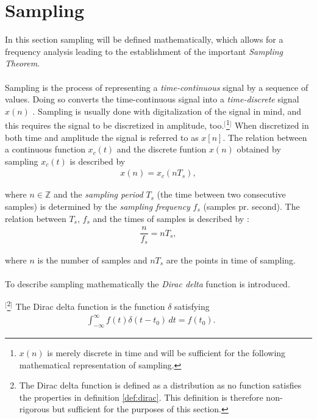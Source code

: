\section{Sampling} \label{sec:sampling}
In this section sampling will be defined mathematically, which allows for a frequency analysis leading to the establishment of the important \textit{Sampling Theorem}.
\\ \\
Sampling is the process of representing a \textit{time-continuous} signal by a sequence of values. Doing so converts the time-continuous signal into a \textit{time-discrete} signal $x(n)$ \cite{pelgrom}. Sampling is usually done with digitalization of the signal in mind, and this requires the signal to be discretized in amplitude, too.$^[$\footnote{$x(n)$ is merely discrete in time and will be sufficient for the following mathematical representation of sampling.}$^]$ When discretized in both time and amplitude the signal is referred to as $x[n]$. The relation between a continuous function $x_c(t)$ and the discrete funtion $x(n)$ obtained by sampling $x_c(t)$ is described by
\begin{align} \label{eq:sampling_principle}
x(n)=x_c(nT_s),
\end{align}

where $n \in \mathbb{Z}$ and the \textit{sampling period} $T_s$ (the time between two consecutive samples) is determined by the \textit{sampling frequency} $f_s$ (samples pr. second). The relation between $T_s$, $f_s$ and the times of samples is described by \cite{pelgrom}:
\begin{align} \label{eq:sample_freq}
\dfrac{n}{f_s} = nT_s,
\end{align}

where $n$ is the number of samples and $nT_s$ are the points in time of sampling.
\\ \\
To describe sampling mathematically the \textit{Dirac delta} function is introduced.

\begin{definition}$^[$\footnote{The Dirac delta function is defined as a distribution as no function satisfies the properties in definition \ref{def:dirac}. This definition is therefore non-rigorous but sufficient for the purposes of this section.}$^]$ \label{def:dirac}
The Dirac delta function is the function $\delta$ satisfying
\begin{align}
\int_{-\infty}^{\infty} \! f(t)\delta(t-t_0) \, dt=f(t_0).\phantom{mm}
\end{align}
\end{definition}

